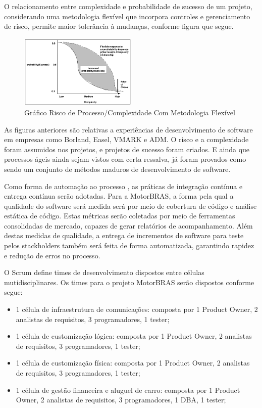 \documentclass[12pt,journal,compsoc]{IEEEtran}
\begin{document}
O relacionamento entre complexidade e probabilidade de sucesso de um projeto, considerando uma metodologia flexível que incorpora controles e gerenciamento de risco, permite maior tolerância à mudanças, conforme figura que segue. 

\begin{figure}[ht!]
\centering
\includegraphics[width=0.5\textwidth]{scrum_risk_complexity_graph_02}
\caption{Gráfico Risco de Processo/Complexidade Com Metodologia Flexível \cite{scrum_development_process}}
\label{fig:scrum_risk_complexity_graph_02}
\end{figure}

As figuras anteriores são relativas a experiências de desenvolvimento de software em empresas como Borland, Easel, VMARK e ADM. O risco e a complexidade foram assumidos nos projetos, e projetos de sucesso foram criados. E ainda que processos ágeis ainda sejam vistos com certa ressalva, já foram provados como sendo um conjunto de métodos maduros de desenvolvimento de software. \cite{agile_meth_hype_reality}

Como forma de automação ao processo \cite{society_software_2004}, as práticas de integração contínua e entrega contínua serão adotadas. Para a MotorBRAS, a forma pela qual a qualidade do software será medida será por meio de cobertura de código e análise estática de código. Estas métricas serão coletadas por meio de ferramentas consolidadas de mercado, capazes de gerar relatórios de acompanhamento. Além destas medidas de qualidade, a entrega de incrementos de software para teste pelos stackholders também será feita de forma automatizada, garantindo rapidez e redução de erros no processo.   

O Scrum define times de desenvolvimento dispostos entre células mutidisciplinares. Os times para o projeto MotorBRAS serão dispostos conforme segue:

\begin{itemize}
\item 1 célula de infraestrutura de comunicações: composta por 1 Product Owner, 2 analistas de requisitos, 3 programadores, 1 tester; 
\item 1 célula de customização lógica: composta por 1 Product Owner, 2 analistas de requisitos, 3 programadores, 1 tester;
\item 1 célula de customização física: composta por 1 Product Owner, 2 analistas de requisitos, 3 programadores, 1 tester;
\item 1 célula de gestão financeira e aluguel de carro: composta por 1 Product Owner, 2 analistas de requisitos, 3 programadores, 1 DBA, 1 tester;
\end{itemize}
\end{document}
